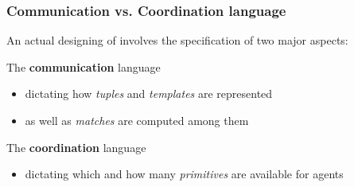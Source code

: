 \documentclass[presentation]{beamer}\mode<presentation>{\usetheme{AMSCesenaPurpleAndGold}}
\begin{document}
\begin{frame}%
	\frametitle{Communication vs. Coordination language}
	
	An actual designing of \linda{} involves the specification of two major aspects:
	
	\vfill
	
	\begin{block}{The \textbf{communication} language}
		\begin{itemize}
			\item dictating how \emph{tuples} and \emph{templates} are represented
			\item as well as \emph{matches} are computed among them
		\end{itemize}
	\end{block}

	\vfill
	
	\begin{block}{The \textbf{coordination} language}
		\begin{itemize}
			\item dictating which and how many \emph{primitives} are available for agents
		\end{itemize}
	\end{block}

\end{frame}
\end{document}

